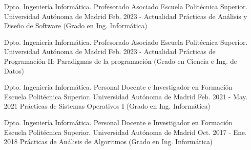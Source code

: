 

\begin{cventries}



  \cventry
    {Dpto. Ingeniería Informática.} %
    {Profesorado Asociado} %
    {Escuela Politécnica Superior. Universidad Autónoma de Madrid} %
    {Feb. 2023 - Actualidad} %
    {Prácticas de Análisis y Diseño de Software (Grado en Ing. Informática)}
    

  \cventry
    {Dpto. Ingeniería Informática.} %
    {Profesorado Asociado} %
    {Escuela Politécnica Superior. Universidad Autónoma de Madrid} %
    {Feb. 2023 - Actualidad} %
    {Prácticas de Programación II: Paradigmas de la programación (Grado en Ciencia e Ing. de Datos)}
    

  \cventry
    {Dpto. Ingeniería Informática.} %
    {Personal Docente e Investigador en Formación} %
    {Escuela Politécnica Superior. Universidad Autónoma de Madrid} %
    {Feb. 2021 - May. 2021} %
    {Prácticas de Sistemas Operativos I (Grado en Ing. Informática)}
    
  \cventry
    {Dpto. Ingeniería Informática.} %
    {Personal Docente e Investigador en Formación} %
    {Escuela Politécnica Superior. Universidad Autónoma de Madrid} %
    {Oct. 2017 - Ene. 2018} %
    {Prácticas de Análisis de Algoritmos (Grado en Ing. Informática)}
    

\end{cventries}
